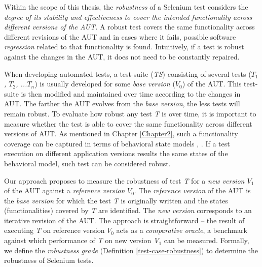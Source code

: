 Within the scope of this thesis, the \textit{robustness} of a Selenium test considers the \textit{degree of its stability and effectiveness to cover the intended functionality across different versions of the AUT.} A robust test covers the same functionality across different revisions of the AUT and in cases where it fails, possible software \textit{regression} related to that functionality is found. Intuitively, if a test is robust against the changes in the AUT, it does not need to be constantly repaired.



  


When developing automated tests, a test-suite (\textit{TS}) consisting of several tests (\textit{$T_1$, $T_2$, ...$T_n$}) is usually developed for some \textit{base version} (\textit{$V_{0}$}) of the AUT. This test-suite is then modified and maintained over time according to the changes in AUT. The farther the AUT evolves from the \textit{base version}, the less tests will remain robust. To evaluate how robust any test \textit{T} is over time, it is important to measure whether the test is able to cover the same functionality across different versions of AUT. As mentioned in Chapter \ref{Chapter2}, such a functionality coverage can be captured in terms of behavioral state models \cite{marchettoStateBased}, \cite{SchurMiningBehavModels}. If a test execution on different application versions results the same states of the behavioral model, such test can be considered robust.

Our approach proposes to measure the robustness of test \textit{T} for a \textit{new version $V_{1}$} of the AUT against a \textit{reference version} \textit{$V_{0}$}. The \textit{reference version} of the AUT is the \textit{base version} for which the test \textit{T} is originally written and the states (functionalities) covered by \textit{T} are identified. The \textit{new version} corresponds to an iterative revision of the AUT. The approach is straightforward -- the result of executing \textit{T} on reference version \textit{$V_{0}$} acts as a \textit{comparative oracle}, a benchmark against which performance of \textit{T} on new version \textit{V$_{1}$} can be measured. Formally, we define the \textit{
robustness grade} (Definition \ref{test-case-robustness}) to determine the robustness of Selenium tests. 

